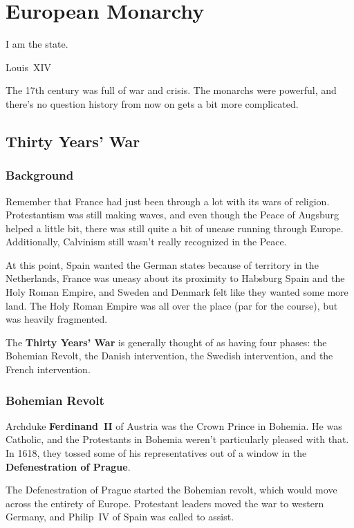 \chapter{European Monarchy}

\epigraph{%
  I am the state.
}{Louis~XIV}

The 17th century was full of war and crisis.
The monarchs were powerful, and there's no question history from now on gets a bit more complicated.

\section{Thirty Years' War}

\subsection*{Background}

Remember that France had just been through a lot with its wars of religion.
Protestantism was still making waves, and even though the Peace of Augsburg helped a little bit,
there was still quite a bit of unease running through Europe.
Additionally, Calvinism still wasn't really recognized in the Peace.

At this point,
Spain wanted the German states because of territory in the Netherlands,
France was uneasy about its proximity to Habsburg Spain and the Holy Roman Empire,
and Sweden and Denmark felt like they wanted some more land.
The Holy Roman Empire was all over the place (par for the course), but was heavily fragmented.

The \textbf{Thirty Years' War} is generally thought of as having four phases:
the Bohemian Revolt,
the Danish intervention,
the Swedish intervention,
and the French intervention.

\subsection*{Bohemian Revolt}

Archduke \textbf{Ferdinand~II} of Austria was the Crown Prince in Bohemia.
He was Catholic, and the Protestants in Bohemia weren't particularly pleased with that.
In 1618,
they tossed some of his representatives out of a window in the \textbf{Defenestration of Prague}.

The Defenestration of Prague started the Bohemian revolt,
which would move across the entirety of Europe.
Protestant leaders moved the war to western Germany, and Philip~IV of Spain was called to assist.

